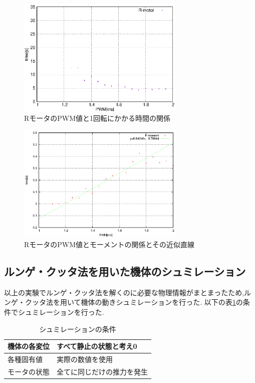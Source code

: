 \documentclass[12pt,oneside]{sotsuken_paper}
\begin{document}
\begin{figure}[htbp]
	\begin{center}
		\includegraphics[width=80mm]{image/moment/moment-time-R.eps}
		\caption{RモータのPWM値と1回転にかかる時間の関係}
		\label{fig:moment-time-R}
	\end{center}
\end{figure}

\begin{figure}[htbp]
	\begin{center}
		\includegraphics[width=80mm]{image/moment/moment.eps}
		\caption{RモータのPWM値とモーメントの関係とその近似直線}
		\label{fig:moment-R}
	\end{center}
\end{figure}

\subsection{ルンゲ・クッタ法を用いた機体のシュミレーション}
以上の実験でルンゲ・クッタ法を解くのに必要な物理情報がまとまったため,ルンゲ・クッタ法を用いて機体の動きシュミレーションを行った.
以下の表\ref{table:syumi}の条件でシュミレーションを行った.

\begin{table}[htbp]
	\begin{center}
		\caption{シュミレーションの条件}
		\begin{tabular}{|l|l|} \hline
			機体の各変位 & すべて静止の状態と考え0 \\ \hline 
			各種固有値 & 実際の数値を使用 \\ \hline
			モータの状態 & 全てに同じだけの推力を発生 \\ \hline
		\end{tabular}
		\label{table:syumi}
	\end{center}
\end{table}
\end{document}
